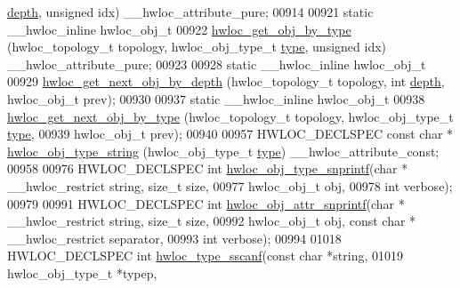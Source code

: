 \begin{DoxyCode}
      \hyperlink{a00238_a4876fd165b4fff35521f07ebd85355ed}{depth}, \textcolor{keywordtype}{unsigned} idx) \_\_hwloc\_attribute\_pure;
00914 
00921 \textcolor{keyword}{static} \_\_hwloc\_inline hwloc\_obj\_t
00922 \hyperlink{a00187_ga6f414dd80a2b943967a0ac92da3181a2}{hwloc\_get\_obj\_by\_type} (hwloc\_topology\_t topology, hwloc\_obj\_type\_t 
      \hyperlink{a00238_acc4f0803f244867e68fe0036800be5de}{type}, \textcolor{keywordtype}{unsigned} idx) \_\_hwloc\_attribute\_pure;
00923 
00928 \textcolor{keyword}{static} \_\_hwloc\_inline hwloc\_obj\_t
00929 \hyperlink{a00187_gac140a9b939d9fa0b30c4a910efcb0656}{hwloc\_get\_next\_obj\_by\_depth} (hwloc\_topology\_t topology, \textcolor{keywordtype}{int} 
      \hyperlink{a00238_a4876fd165b4fff35521f07ebd85355ed}{depth}, hwloc\_obj\_t prev);
00930 
00937 \textcolor{keyword}{static} \_\_hwloc\_inline hwloc\_obj\_t
00938 \hyperlink{a00187_ga759e88eaf5a230ad283e9d4c42486735}{hwloc\_get\_next\_obj\_by\_type} (hwloc\_topology\_t topology, hwloc\_obj\_type\_t 
      \hyperlink{a00238_acc4f0803f244867e68fe0036800be5de}{type},
00939                             hwloc\_obj\_t prev);
00940 
00957 HWLOC\_DECLSPEC \textcolor{keyword}{const} \textcolor{keywordtype}{char} * \hyperlink{a00188_ga5ca0bf94bbbb080d0eff17a57bd90422}{hwloc\_obj\_type\_string} (hwloc\_obj\_type\_t 
      \hyperlink{a00238_acc4f0803f244867e68fe0036800be5de}{type}) \_\_hwloc\_attribute\_const;
00958 
00976 HWLOC\_DECLSPEC \textcolor{keywordtype}{int} \hyperlink{a00188_gadb8765c260edea80c52cd06a76639ba4}{hwloc\_obj\_type\_snprintf}(\textcolor{keywordtype}{char} * \_\_hwloc\_restrict \textcolor{keywordtype}{string}, \textcolor{keywordtype}{size\_t} 
      size,
00977                                            hwloc\_obj\_t obj,
00978                                            \textcolor{keywordtype}{int} verbose);
00979 
00991 HWLOC\_DECLSPEC \textcolor{keywordtype}{int} \hyperlink{a00188_ga870e876931c282a1c7aee2f031912ce3}{hwloc\_obj\_attr\_snprintf}(\textcolor{keywordtype}{char} * \_\_hwloc\_restrict \textcolor{keywordtype}{string}, \textcolor{keywordtype}{size\_t} 
      size,
00992                                            hwloc\_obj\_t obj, \textcolor{keyword}{const} \textcolor{keywordtype}{char} * \_\_hwloc\_restrict separator,
00993                                            \textcolor{keywordtype}{int} verbose);
00994 
01018 HWLOC\_DECLSPEC \textcolor{keywordtype}{int} \hyperlink{a00188_ga510f21b066fba2dab12b8c9b173b1dfd}{hwloc\_type\_sscanf}(\textcolor{keyword}{const} \textcolor{keywordtype}{char} *\textcolor{keywordtype}{string},
01019                                      hwloc\_obj\_type\_t *typep,

\end{DoxyCode}
